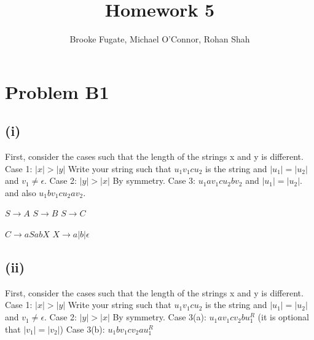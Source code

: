 \documentclass[12pt]{article}
\begin{document}
\pagestyle{plain}
\titleformat{\subsection}[runin]
  {\normalfont\large\bfseries}{\thesubsection}{1em}{}

\title{Homework 5}
\author{Brooke Fugate, Michael O'Connor, Rohan Shah}
\date{}

\maketitle

\section*{Problem B1}
\subsection*{(i)}

First, consider the cases such that the length of the strings x and y is different. \newline
Case 1: $|x| > |y|$ Write your string such that $u_1v_1cu_2$ is the string and $|u_1|=|u_2|$ and $v_1 \neq \epsilon$. \newline
Case 2: $|y| > |x|$ By symmetry. \newline
Case 3: $u_1av_1cu_2bv_2$ and $|u_1|=|u_2|$. and also $u_1bv_1cu_2av_2$.

$S \rightarrow A$ \newline
$S \rightarrow B$ \newline
$S \rightarrow C$ \newline

$C \rightarrow aSabX$ \newline
$X \rightarrow a|b|\epsilon$ \newline

\subsection*{(ii)}

First, consider the cases such that the length of the strings x and y is different. \newline
Case 1: $|x| > |y|$ Write your string such that $u_1v_1cu_2$ is the string and $|u_1|=|u_2|$ and $v_1 \neq \epsilon$. \newline
Case 2: $|y| > |x|$ By symmetry. \newline
Case 3(a): $u_1av_1cv_2bu_1^R$ (it is optional that $|v_1|=|v_2|$) \newline
Case 3(b): $u_1bv_1cv_2au_1^R$
\end{document}
